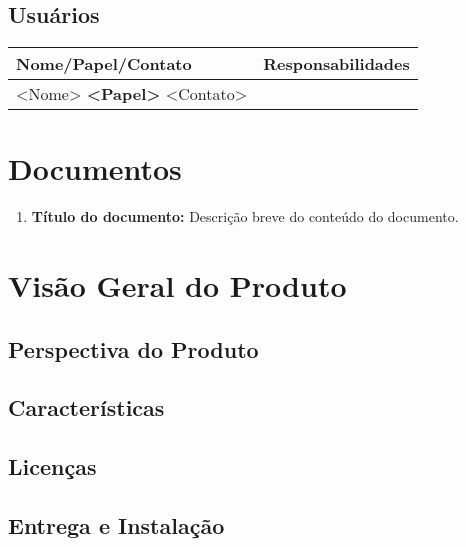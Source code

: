 \documentclass{article}
\begin{document}
\subsection{Usuários}    

  \FloatBarrier
  \begin{table}[H]
    \begin{center} \label{tab:definitions}
      \begin{tabular}[pos]{|m{6cm} | m{9cm}|} 
        \hline
        \cellcolor[gray]{0.9}\textbf{Nome/Papel/Contato} &\cellcolor[gray]{0.9}\textbf{Responsabilidades}\\ \hline
        <Nome> \newline 
        \textbf{<Papel>} \newline 
        <Contato> & \\ \hline
       
      \end{tabular}
    \end{center}
  \end{table}

\section{Documentos}
  
  \begin{enumerate}
  \item \textbf{Título do documento:} Descrição breve do conteúdo do documento.
  \end{enumerate}

\section{Visão Geral do Produto}
\subsection{Perspectiva do Produto}

\subsection{Características}

\subsection{Licenças}

\subsection{Entrega e Instalação}
\end{document}
